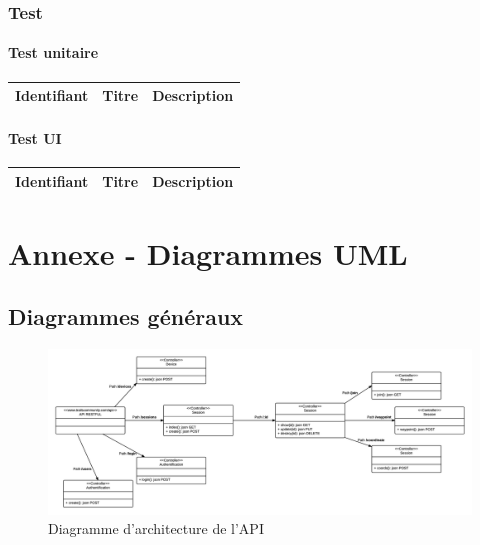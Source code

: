 \documentclass[titlepage, 12pt]{report}
\begin{document}
\section{Test}

\subsection{Test unitaire}

\begin{center}
	\begin{tabular}{|c|c|c|}
		\hline
		Identifiant & Titre & Description \\
		\hline \hline
	\end{tabular}
\end{center}

\subsection{Test UI}

\begin{center}
	\begin{tabular}{|c|c|c|}
		\hline
		Identifiant & Titre & Description \\
		\hline \hline
	\end{tabular}
\end{center}


\part{Annexe - Diagrammes UML}

\chapter{Diagrammes généraux}

\begin{figure}[!h]
	\caption{Diagramme d'architecture de l'API}
	\label{API_architecture}
	\centering
	\includegraphics[scale=0.5]{Images/diagram/API_architecture.png}
\end{figure}
\end{document}
